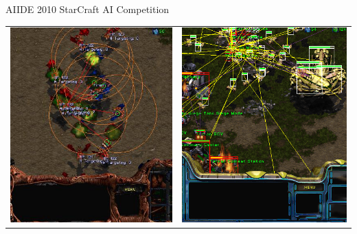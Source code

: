 \documentclass[10pt]{beamer}
\begin{document}
\begin{frame}{AIIDE 2010 StarCraft AI Competition}
\begin{center}
	  \begin{tabular}{cc}
	  \includegraphics[scale=0.3]{cosa.png} &
	  \includegraphics[scale=0.3]{otra.png} 
	  \end{tabular}
	  
\end{center}

\end{frame}
\end{document}
